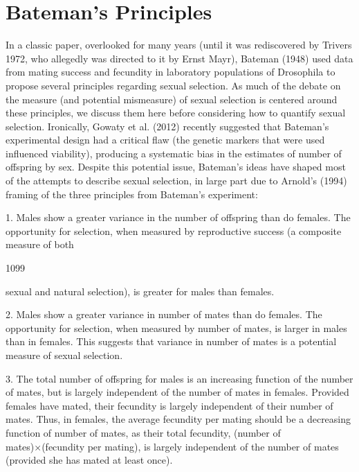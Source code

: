 \documentclass{article}
\begin{document}
\section{Bateman's Principles}
In a classic paper, overlooked for many years (until it was rediscovered by Trivers 1972, who allegedly was directed to it by Ernst Mayr), Bateman (1948) used data from mating success and fecundity in laboratory populations of Drosophila to propose several principles regarding sexual selection. As much of the debate on the measure (and potential mismeasure) of sexual selection is centered around these principles, we discuss them here before considering how to quantify sexual selection. Ironically, Gowaty et al. (2012) recently suggested that Bateman's experimental design had a critical flaw (the genetic markers that were used influenced viability), producing a systematic bias in the estimates of number of offspring by sex. Despite this potential issue, Bateman's ideas have shaped most of the attempts to describe sexual selection, in large part due to Arnold's (1994) framing of the three principles from Bateman's experiment:

1. Males show a greater variance in the number of offspring than do females. The opportunity for selection, when measured by reproductive success (a composite measure of both

1099

sexual and natural selection), is greater for males than females.

2. Males show a greater variance in number of mates than do females. The opportunity for selection, when measured by number of mates, is larger in males than in females. This suggests that variance in number of mates is a potential measure of sexual selection.

3. The total number of offspring for males is an increasing function of the number of mates, but is largely independent of the number of mates in females. Provided females have mated, their fecundity is largely independent of their number of mates. Thus, in females, the average fecundity per mating should be a decreasing function of number of mates, as their total fecundity, (number of mates)×(fecundity per mating), is largely independent of the number of mates (provided she has mated at least once).
\end{document}

